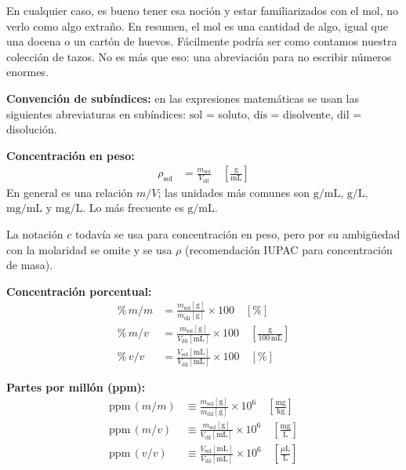 En cualquier caso, es bueno tener esa noción y estar familiarizados con el 
mol, no verlo como algo extraño. En resumen, el mol es una cantidad de algo, 
igual que una docena o un cartón de huevos. Fácilmente podría ser como 
contamos nuestra colección de tazos. No es más que eso: una abreviación 
para no escribir números enormes. \\

\begin{notafija}
\textbf{Convención de subíndices:} en las expresiones matemáticas se usan las 
siguientes abreviaturas en subíndices: $\mathrm{sol}$ = soluto, 
$\mathrm{dis}$ = disolvente, $\mathrm{dil}$ = disolución.
\end{notafija}

\textbf{Concentración en peso:}
\begin{align*}
    \rho_{\mathrm{sol}} &= \frac{m_{\mathrm{sol}}}{V_{\mathrm{dil}}}
    \quad \left[\frac{\mathrm{g}}{\mathrm{mL}}\right]
\end{align*}
En general es una relación \(m/V\); las unidades más comunes son $\mathrm{g/mL}$, $\mathrm{g/L}$, $\mathrm{mg/mL}$ y $\mathrm{mg/L}$. Lo más frecuente es $\mathrm{g/mL}$.

\begin{notafija}
La notación \(c\) todavía se usa para concentración en peso, pero por su 
ambigüedad con la molaridad se omite y se usa \(\rho\) (recomendación IUPAC 
para concentración de masa).
\end{notafija}

\textbf{Concentración porcentual:}
\begin{align*}
    \%\,m/m &= \frac{m_{\mathrm{sol}}[\mathrm{g}]}{m_{\mathrm{dil}}[\mathrm{g}]} \times 100 \quad [\%] \\[4pt]
    \%\,m/v &= \frac{m_{\mathrm{sol}}[\mathrm{g}]}{V_{\mathrm{dil}}[\mathrm{mL}]} \times 100 \quad \left[\frac{\mathrm{g}}{100\,\mathrm{mL}}\right] \\[4pt]
    \%\,v/v &= \frac{V_{\mathrm{sol}}[\mathrm{mL}]}{V_{\mathrm{dil}}[\mathrm{mL}]} \times 100 \quad [\%]
\end{align*}

\textbf{Partes por millón (ppm):}
\begin{align*}
    \mathrm{ppm}\,(m/m) &\equiv \frac{m_{\mathrm{sol}}[\mathrm{g}]}{m_{\mathrm{dil}}[\mathrm{g}]} \times 10^6 \quad \left[\frac{\mathrm{mg}}{\mathrm{kg}}\right] \\[4pt]
    \mathrm{ppm}\,(m/v) &\equiv \frac{m_{\mathrm{sol}}[\mathrm{g}]}{V_{\mathrm{dil}}[\mathrm{mL}]} \times 10^6 \quad \left[\frac{\mathrm{mg}}{\mathrm{L}}\right] \\[4pt]
    \mathrm{ppm}\,(v/v) &\equiv \frac{V_{\mathrm{sol}}[\mathrm{mL}]}{V_{\mathrm{dil}}[\mathrm{mL}]} \times 10^6 \quad \left[\frac{\mu\mathrm{L}}{\mathrm{L}}\right]
\end{align*}

